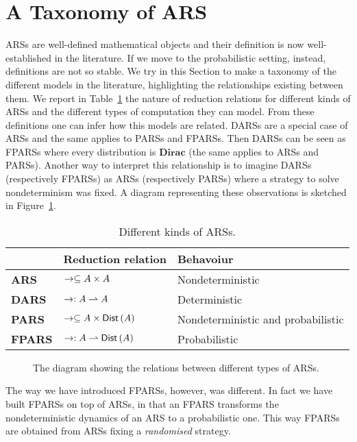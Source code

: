 \section{A Taxonomy of ARS}
ARSs are well-defined mathematical objects and their definition is now well-established in the literature. If we move to the probabilistic setting, instead, definitions are not so stable. We try in this Section to make a taxonomy of the different models in the literature, highlighting the relationships existing between them. We report in Table~\ref{table:ars} the nature of reduction relations for different kinds of ARSs and the different types of computation they can model. From these definitions one can infer how this models are related. DARSs are a special case of ARSs and the same applies to PARSs and FPARSs. Then DARSs can be seen as FPARSs where every distribution is $\textbf{Dirac}$ (the same applies to ARSs and PARSs). Another way to interpret this relationship is to imagine DARSs (respectively FPARSs) as ARSs (respectively PARSs) where a strategy to solve nondeterminism was fixed. A diagram representing these observations is sketched in Figure~\ref{figure:diagars}. 
\begin{table}
	\begin{tabular}{|l|l|l|}
		\hline 
		& \textbf{Reduction relation} & \textbf{Behavoiur}\tabularnewline
		\hline 
		\textbf{ARS} & $\rightarrow\subseteq A\times A$ & Nondeterministic\tabularnewline
		\hline 
		\textbf{DARS} & $\rightarrow:A\rightharpoonup A$ & Deterministic\tabularnewline
		\hline 
		\textbf{PARS} & $\rightarrow\subseteq A\times\textsf{Dist}\left(A\right)$ & Nondeterministic and probabilistic\tabularnewline
		\hline 
		\textbf{FPARS} & $\rightarrow:A\rightharpoonup\textsf{Dist}\left(A\right)$ & Probabilistic\tabularnewline
		\hline 
	\end{tabular}
	\caption{Different kinds of ARSs.}
	\label{table:ars}
\end{table}
\begin{figure}
	\caption{The diagram showing the relations between different types of ARSs.}
	\label{figure:diagars}
\end{figure}
The way we have introduced FPARSs, however, was different. In fact we have built FPARSs on top of ARSs, in that an FPARS transforms the nondeterministic dynamics of an ARS to a probabilistic one. This way FPARSs are obtained from ARSs fixing a \emph{randomised} strategy.
